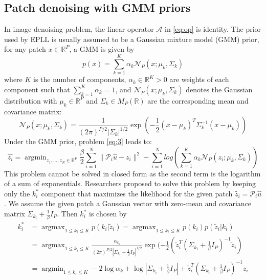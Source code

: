 \documentclass[12pt,a4paper]{article}
\DeclareMathOperator*{\argmin}{argmin}
\DeclareMathOperator*{\argmax}{argmax}
\begin{document}
\subsection{Patch denoising with GMM priors}
In image denoising problem, the linear operator $\mathcal{A}$ in \eqref{eq:op} is identity.
The prior used by EPLL is usually assumed to be a Gaussian mixture model (GMM) prior, for any patch $x \in \mathbb{R}^P$, a GMM is given by 
\begin{equation}\label{eq:gmm}
    p(x) = \sum_{k = 1}^K \alpha_k \mathcal{N}_P(x;\mu_k,\Sigma_k) 
\end{equation}
where $K$ is the number of components, $\alpha_k \in \mathbb{R}^K> 0$ are weights of each component such that $\sum_{k=1}^K \alpha_k = 1$, and $\mathcal{N}_P(x;\mu_k,\Sigma_k)$ denotes the Gaussian distribution with $\mu_k\in \mathbb{R}^P$ and $\Sigma_k \in M_P(\mathbb{R})$ are the corresponding mean and covariance matrix:
\begin{equation}
    \mathcal{N}_P(x;\mu_k,\Sigma_k) = \frac{1}{(2\pi)^{P/2}|\Sigma_k|^{1/2}}\exp (-\frac{1}{2}(x-\mu_k)^T\Sigma_k^{-1}(x-\mu_k))
\end{equation}
Under the GMM prior, problem \eqref{eq:3} leads to:
\begin{equation}
    \hat{z_i} = \argmin_{z_1,...,z_N \in \mathbb{R}^P} \frac{\beta}{2}\sum_{i = 1}^N \|\mathcal{P}_i \hat{u} - z_i\|^2- \sum_{i = 1}^ N{log(\sum_{k = 1}^K \alpha_k \mathcal{N}_P(z_i;\mu_k,\Sigma_k))}
\end{equation}
This problem cannot be solved in closed form as the second term is the logarithm of a sum of exponentials.
Researchers \cite{Zoran} proposed to solve this problem by keeping only the $k_i^*$ component that maximizes the likelihood for the given patch $\tilde{z_i} = \mathcal{P}_i \hat{u}$.
We assume the given patch a Gaussian vector with zero-mean and covariance matrix $\Sigma_{k_i} +\frac{1}{\beta}I_P$. Then $k_i^*$ is chosen by 
\begin{equation}\label{eq:4}
\begin{aligned}
    k_i^* &= \argmax_{1 \leq k_i \leq K} p(k_i|\tilde{z}_i) = \argmax_{1 \leq k_i \leq K}p(k_i)p(\tilde{z}_i|k_i)\\
    & = \argmax_{1 \leq k_i \leq K} \frac{\alpha_{k_i}}{(2\pi)^{P/2}|\Sigma_{k_i}  +\frac{1}{\beta}I_P|^{1/2}}\exp (-\frac{1}{2}(\tilde{z}_i^T(\Sigma_{k_i} +\frac{1}{\beta}I_P)^{-1}\tilde{z}_i)\\
    & = \argmin _{1 \leq k_i \leq K} -2\log\alpha_k + \log \left|\Sigma_{k_i}  +\frac{1}{\beta}I_P\right| + \tilde{z}_i^T(\Sigma_{k_i} +\frac{1}{\beta}I_P)^{-1}z_i
\end{aligned}
\end{equation}
\end{document}
